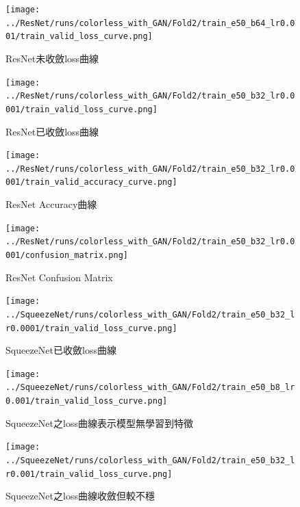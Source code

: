     \begin{figure}[!t]
        \centering
        \texttt{[image: ../ResNet/runs/colorless\_with\_GAN/Fold2/train\_e50\_b64\_lr0.001/train\_valid\_loss\_curve.png]}
        \caption{ResNet未收斂loss曲線}
        \label{fig:ResNet_unconvergence_loss_curve}
    \end{figure}
    \begin{figure}[!t]
        \centering
        \texttt{[image: ../ResNet/runs/colorless\_with\_GAN/Fold2/train\_e50\_b32\_lr0.0001/train\_valid\_loss\_curve.png]}
        \caption{ResNet已收斂loss曲線}
        \label{fig:ResNet_convergence_loss_curve}
    \end{figure}
    \begin{figure}[!t]
        \centering
        \texttt{[image: ../ResNet/runs/colorless\_with\_GAN/Fold2/train\_e50\_b32\_lr0.0001/train\_valid\_accuracy\_curve.png]}
        \caption{ResNet Accuracy曲線}
        \label{fig:ResNet_accuracy_curve}
    \end{figure}
    \begin{figure}[!t]
        \centering
        \texttt{[image: ../ResNet/runs/colorless\_with\_GAN/Fold2/train\_e50\_b32\_lr0.0001/confusion\_matrix.png]}
        \caption{ResNet Confusion Matrix}
        \label{fig:ResNet_confusion_matrix}
    \end{figure}
    \begin{figure}[!t]
        \centering
        \texttt{[image: ../SqueezeNet/runs/colorless\_with\_GAN/Fold2/train\_e50\_b32\_lr0.0001/train\_valid\_loss\_curve.png]}
        \caption{SqueezeNet已收斂loss曲線}
        \label{fig:SqueezeNet_convergence_loss_curve}
    \end{figure}
    \begin{figure}[!t]
        \centering
        \texttt{[image: ../SqueezeNet/runs/colorless\_with\_GAN/Fold2/train\_e50\_b8\_lr0.001/train\_valid\_loss\_curve.png]}
        \caption{SqueezeNet之loss曲線表示模型無學習到特徵}
        \label{fig:SqueezeNet_unconvergence_loss_curve}
    \end{figure}
    \begin{figure}[!t]
        \centering
        \texttt{[image: ../SqueezeNet/runs/colorless\_with\_GAN/Fold2/train\_e50\_b32\_lr0.001/train\_valid\_loss\_curve.png]}
        \caption{SqueezeNet之loss曲線收斂但較不穩}
        \label{fig:SqueezeNet_unconvergence_loss_curve_1e-3}
    \end{figure}

